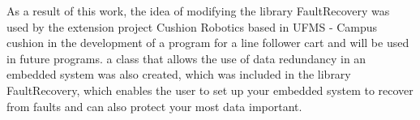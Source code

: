 {As a result of this work, the idea of modifying the library FaultRecovery was used by the extension project Cushion Robotics based in UFMS - Campus cushion in the development of a program for a line follower cart and will be used in future programs. a class that allows the use of data redundancy in an embedded system was also created, which was included in the library FaultRecovery, which enables the user to set up your embedded system to recover from faults and can also protect your most data important.
}

\thispagestyle{empty}
\clearpage
\cleardoublepage
